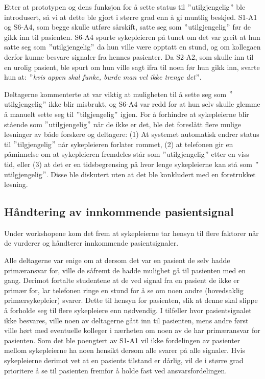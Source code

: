 \noindent
Etter at prototypen og dens funksjon for å sette status til $"$utilgjengelig$"$ ble introdusert, så vi at dette ble gjort i større grad enn å gi muntlig beskjed. S1-A1 og S6-A4, som begge skulle utføre sårskift, satte seg som $"$utilgjengelig$"$ før de gikk inn til pasienten. S6-A4 spurte sykepleieren på tunet om det var greit at hun satte seg som $"$utilgjengelig$"$ da hun ville være opptatt en stund, og om kollegaen derfor kunne besvare signaler fra hennes pasienter. Da S2-A2, som skulle inn til en urolig pasient, ble spurt om hun ville sagt ifra til noen før hun gikk inn, svarte hun at: \emph{$"$hvis appen skal funke, burde man vel ikke trenge det$"$}.

\noindent
Deltagerne kommenterte at var viktig at muligheten til å sette seg som $"$utilgjengelig$"$ ikke blir misbrukt, og S6-A4 var redd for at hun selv skulle glemme å manuelt sette seg til $"$tilgjengelig$"$ igjen. For å forhindre at sykepleierne blir stående som $"$utilgjengelig$"$ når de ikke er det, ble det foreslått flere mulige løsninger av både forskere og deltagere: (1) At systemet automatisk endrer status til $"$tilgjengelig$"$ når sykepleieren forlater rommet, (2) at telefonen gir en påminnelse om at sykepleieren fremdeles står som $"$utilgjengelig$"$ etter en viss tid, eller (3) at det er en tidsbegrensing på hvor lenge sykepleierne kan stå som $"$utilgjengelig$"$. Disse ble diskutert uten at det ble konkludert med en foretrukket løsning. 

\subsection{Håndtering av innkommende pasientsignal}
Under workshopene kom det frem at sykepleierne tar hensyn til flere faktorer når de vurderer og håndterer innkommende pasientsignaler. 

\noindent
Alle deltagerne var enige om at dersom det var en pasient de selv hadde primæransvar for, ville de såfremt de hadde mulighet gå til pasienten med en gang. Derimot fortalte studentene at de ved signal fra en pasient de ikke er primær for, lar telefonen ringe en stund for å se om noen andre (hovedsaklig primærsykepleier) svarer. Dette til hensyn for pasienten, slik at denne skal slippe å forholde seg til flere sykepleiere enn nødvendig. I tilfeller hvor pasientsignalet ikke besvares, ville noen av deltagerne gått inn til pasienten, mens andre først ville hørt med eventuelle kolleger i nærheten om noen av de har primæransvar for pasienten. Som det ble poengtert av S1-A1 vil ikke fordelingen av pasienter mellom sykepleierne ha noen hensikt dersom alle svarer på alle signaler. Hvis sykepleierne derimot vet at en pasients tilstand er dårlig, vil de i større grad prioritere å se til pasienten fremfor å holde fast ved ansvarsfordelingen. 

